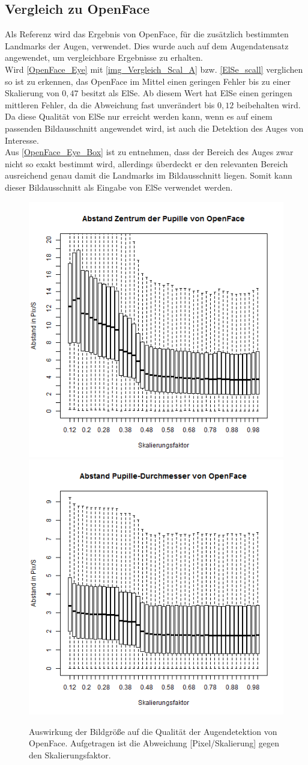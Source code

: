 \subsection{Vergleich zu OpenFace}
Als Referenz wird das Ergebnis von OpenFace, für die zusätzlich bestimmten Landmarks der Augen, verwendet. Dies wurde auch auf dem Augendatensatz \cite{database_Eye} angewendet, um vergleichbare Ergebnisse zu erhalten.\\
Wird \autoref{OpenFace_Eye} mit \autoref{img_Vergleich_Scal_A} bzw. \autoref{ElSe_scall} verglichen so ist zu erkennen, das OpenFace im Mittel einen geringen Fehler bis zu einer Skalierung von $0,47$ besitzt als ElSe. Ab diesem Wert hat ElSe einen geringen mittleren Fehler, da die Abweichung fast unverändert bis $0,12$ beibehalten wird.\\
Da diese Qualität von ElSe nur erreicht werden kann, wenn es auf einem passenden Bildausschnitt angewendet wird, ist auch die Detektion des Auges von Interesse.\\
Aus \autoref{OpenFace_Eye_Box} ist zu entnehmen, dass der Bereich des Auges zwar nicht so exakt bestimmt wird, allerdings überdeckt er den relevanten Bereich ausreichend genau damit die Landmarks im Bildausschnitt liegen. Somit kann dieser Bildausschnitt als Eingabe von ElSe verwendet werden.
\begin{figure}
	\centering
	\includegraphics[width=0.49\linewidth]{Eye_Img_Box/Openface_PC}
	\includegraphics[width=0.49\linewidth]{Eye_Img_Box/Openface_PW}
	\caption{Auswirkung der Bildgröße auf die Qualität der Augendetektion von OpenFace. Aufgetragen ist die Abweichung [Pixel/Skalierung] gegen den Skalierungsfaktor.}
	\label{OpenFace_Eye}
\end{figure}
